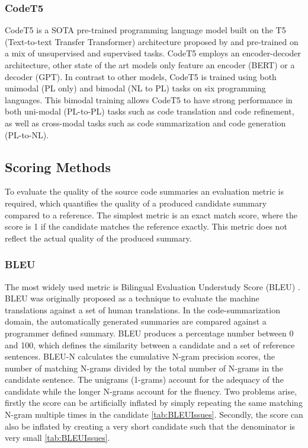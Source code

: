 \subsubsection{CodeT5}
CodeT5 is a SOTA pre-trained programming language model built on the T5 (Text-to-text Transfer Transformer) architecture proposed by \citeauthor{CodeT5} and pre-trained on a mix of unsupervised and supervised tasks. CodeT5 employs an encoder-decoder architecture, other state of the art models only feature an encoder (BERT) or a decoder (GPT).
In contrast to other models, CodeT5 is trained using both unimodal (PL only) and bimodal (NL to PL) tasks on six programming languages. This bimodal training allows CodeT5 to have strong performance in both uni-modal (PL-to-PL) tasks such as code translation and code refinement, as well as cross-modal tasks such as code summarization and code generation (PL-to-NL).

\subsection{Scoring Methods}
To evaluate the quality of the source code summaries an evaluation metric is required, which quantifies the quality of a produced candidate summary compared to a reference. The simplest metric is an exact match score, where the score is 1 if the candidate matches the reference exactly. This metric does not reflect the actual quality of the produced summary.

\subsubsection{BLEU}
The most widely used metric is Bilingual Evaluation Understudy Score (BLEU) \cite{evaluationSummarization}. BLEU was originally proposed as a technique to evaluate the machine translations against a set of human translations. In the code-summarization domain, the automatically generated summaries are compared against a programmer defined summary. 
BLEU produces a percentage number between 0 and 100, which defines the similarity between a candidate and a set of reference sentences. BLEU-N calculates the cumulative N-gram precision scores, the number of matching N-grams divided by the total number of N-grams in the candidate sentence. The unigrams (1-grams) account for the adequacy of the candidate while the longer N-grams account for the fluency. 
Two problems arise, firstly the score can be artificially inflated by simply repeating the same matching N-gram multiple times in the candidate \ref{tab:BLEUIssues}. Secondly, the score can also be inflated by creating a very short candidate such that the denominator is very small \ref{tab:BLEUIssues}.

